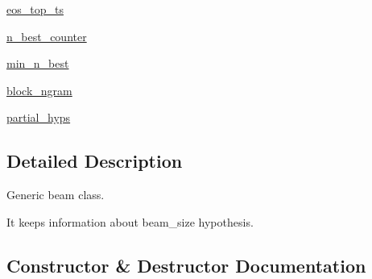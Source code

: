 \begin{DoxyCompactItemize}
\item 
\hyperlink{classparlai_1_1agents_1_1legacy__agents_1_1seq2seq_1_1torch__agent__v1_1_1Beam_ab1d9fb1a27a4a96ea9293720eb812487}{eos\+\_\+top\+\_\+ts}
\item 
\hyperlink{classparlai_1_1agents_1_1legacy__agents_1_1seq2seq_1_1torch__agent__v1_1_1Beam_a44a03facdc6259db57720fcae9f9a6ed}{n\+\_\+best\+\_\+counter}
\item 
\hyperlink{classparlai_1_1agents_1_1legacy__agents_1_1seq2seq_1_1torch__agent__v1_1_1Beam_a65b34839f24c68fa76df61cff22e177e}{min\+\_\+n\+\_\+best}
\item 
\hyperlink{classparlai_1_1agents_1_1legacy__agents_1_1seq2seq_1_1torch__agent__v1_1_1Beam_aa2ba93350ee7aa9ab2ae5ba01c1c0c1e}{block\+\_\+ngram}
\item 
\hyperlink{classparlai_1_1agents_1_1legacy__agents_1_1seq2seq_1_1torch__agent__v1_1_1Beam_a35c45bf55c21713f720fffdaafc68081}{partial\+\_\+hyps}
\end{DoxyCompactItemize}


\subsection{Detailed Description}
\begin{DoxyVerb}Generic beam class.

It keeps information about beam_size hypothesis.
\end{DoxyVerb}
 

\subsection{Constructor \& Destructor Documentation}
\mbox{\label{classparlai_1_1agents_1_1legacy__agents_1_1seq2seq_1_1torch__agent__v1_1_1Beam_af0f9f1c8fc21c9a00932129c2239b6a9}} 
